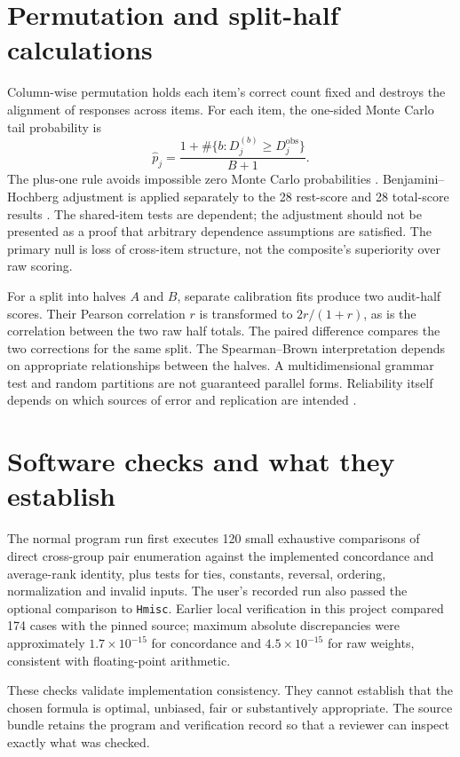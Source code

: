 \documentclass[11pt,a4paper,oneside,headings=normal,parskip=half]{scrreprt}
\newcommand{\code}[1]{\nolinkurl{#1}}
\begin{document}
\section{Permutation and split-half calculations}
Column-wise permutation holds each item's correct count fixed and destroys the alignment of responses across items. For each item, the one-sided Monte Carlo tail probability is
\begin{equation}
\widehat p_j=\frac{1+\#\{b:D_j^{(b)}\ge D_j^{\mathrm{obs}}\}}{B+1}.
\end{equation}
The plus-one rule avoids impossible zero Monte Carlo probabilities \citep{phipson}. Benjamini--Hochberg adjustment is applied separately to the 28 rest-score and 28 total-score results \citep{bh}. The shared-item tests are dependent; the adjustment should not be presented as a proof that arbitrary dependence assumptions are satisfied. The primary null is loss of cross-item structure, not the composite's superiority over raw scoring.

For a split into halves $A$ and $B$, separate calibration fits produce two audit-half scores. Their Pearson correlation $r$ is transformed to $2r/(1+r)$, as is the correlation between the two raw half totals. The paired difference compares the two corrections for the same split. The Spearman--Brown interpretation depends on appropriate relationships between the halves. A multidimensional grammar test and random partitions are not guaranteed parallel forms. Reliability itself depends on which sources of error and replication are intended \citep{revelle}.

\section{Software checks and what they establish}
The normal program run first executes 120 small exhaustive comparisons of direct cross-group pair enumeration against the implemented concordance and average-rank identity, plus tests for ties, constants, reversal, ordering, normalization and invalid inputs. The user's recorded run also passed the optional comparison to \code{Hmisc}. Earlier local verification in this project compared 174 cases with the pinned source; maximum absolute discrepancies were approximately $1.7\times10^{-15}$ for concordance and $4.5\times10^{-15}$ for raw weights, consistent with floating-point arithmetic.

These checks validate implementation consistency. They cannot establish that the chosen formula is optimal, unbiased, fair or substantively appropriate. The source bundle retains the program and verification record so that a reviewer can inspect exactly what was checked.
\end{document}
